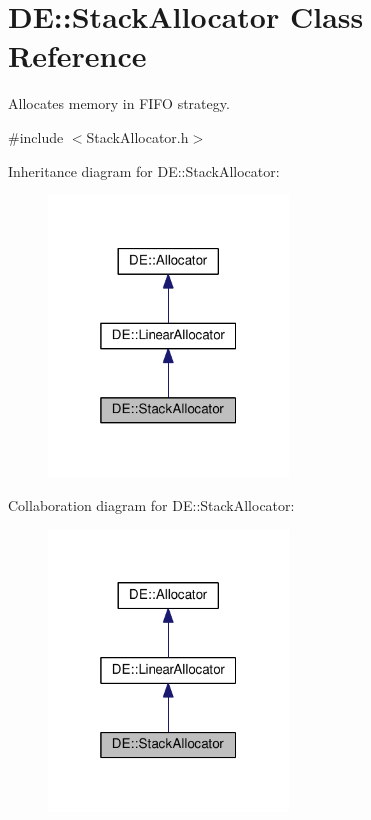 \hypertarget{classDE_1_1StackAllocator}{}\section{DE\+:\+:Stack\+Allocator Class Reference}
\label{classDE_1_1StackAllocator}


Allocates memory in F\+I\+FO strategy.  




{\ttfamily \#include $<$Stack\+Allocator.\+h$>$}



Inheritance diagram for DE\+:\+:Stack\+Allocator\+:\nopagebreak
\begin{figure}[H]
\begin{center}
\leavevmode
\includegraphics[width=181pt]{classDE_1_1StackAllocator__inherit__graph}
\end{center}
\end{figure}


Collaboration diagram for DE\+:\+:Stack\+Allocator\+:\nopagebreak
\begin{figure}[H]
\begin{center}
\leavevmode
\includegraphics[width=181pt]{classDE_1_1StackAllocator__coll__graph}
\end{center}
\end{figure}
